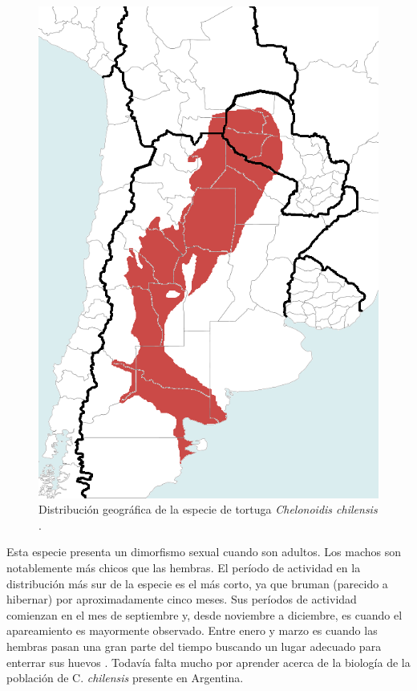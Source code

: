 \begin{figure}[ht]
    \begin{center}
        \includegraphics[width=\imsize]{figs/Chap1/Chelonoidis_chilensis_geographic_range.png}
        \caption{Distribución geográfica de la especie de tortuga \textit{Chelonoidis chilensis}
        \label{fig:distribuciondeEspecie}.}
       
        \end{center}
\end{figure}
Esta especie presenta un dimorfismo sexual cuando son adultos. Los machos son notablemente más chicos que las hembras. El período de actividad en la distribución más sur de la especie es el más corto, ya que bruman (parecido a hibernar) por aproximadamente cinco meses. Sus períodos de actividad comienzan en el mes de septiembre y, desde noviembre a diciembre, es cuando el apareamiento es mayormente observado. Entre enero y marzo es cuando las hembras pasan una gran parte del tiempo buscando un lugar adecuado para enterrar sus huevos \cite{Erika}. Todavía falta mucho por aprender acerca de la biología de la población de C. \textit{chilensis} presente en Argentina.
 
